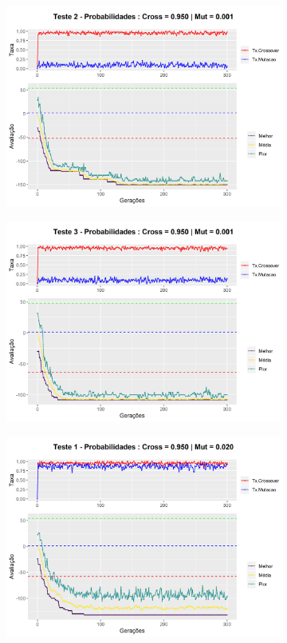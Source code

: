 \begin{figure}[h!]
\begin{subfigure}[b]{0.47\linewidth}
		\includegraphics[width=\linewidth]{imagens/graph_pc_0_950_pm_0_001_pop_50_g_300__2.png}
		\caption{}
	\end{subfigure}
	\begin{subfigure}[b]{0.47\linewidth}
		\includegraphics[width=\linewidth]{imagens/graph_pc_0_950_pm_0_001_pop_50_g_300__3.png}
		\caption{}
	\end{subfigure}
	\begin{subfigure}[b]{0.47\linewidth}
		\includegraphics[width=\linewidth]{imagens/graph_pc_0_950_pm_0_020_pop_50_g_300__1.png}

\end{subfigure}
\end{figure}
